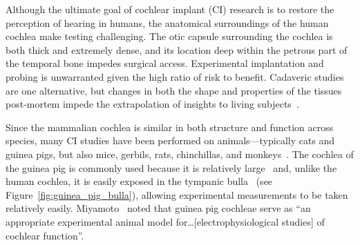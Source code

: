 Although the ultimate goal of cochlear implant (CI) research is to restore the
perception of hearing in humans, the anatomical surroundings of the human
cochlea make \invivo{} testing challenging. The otic capsule surrounding the
cochlea is both thick and extremely dense, and its location deep within the
petrous part of the temporal bone impedes surgical access. Experimental
implantation and probing is unwarranted given the high ratio of risk to benefit.
Cadaveric studies are one alternative, but changes in both the shape and
properties of the tissues post-mortem impede the extrapolation of insights to
living subjects~\cite{ifukube1987,kral1998}.


Since the mammalian cochlea is similar in both structure and function across
species, many CI studies have been performed on animals---typically cats and
guinea pigs, but also mice, gerbils, rats, chinchillas, and
monkeys~\cite{axelsson1968,greenwood1990,kral1998,zeng2004}. The cochlea of the
guinea pig is commonly used because it is relatively large~\cite{zeng2004} and,
unlike the human cochlea, it is easily exposed in the tympanic
bulla~\cite{cooper1975} (see Figure~\ref{fig:guinea_pig_bulla}), allowing
experimental measurements to be taken relatively easily.
Miyamoto~\cite{miyamoto1986} noted that guinea pig cochleae serve as ``an
appropriate experimental animal model for\ldots[electrophysiological studies] of
cochlear function''.

